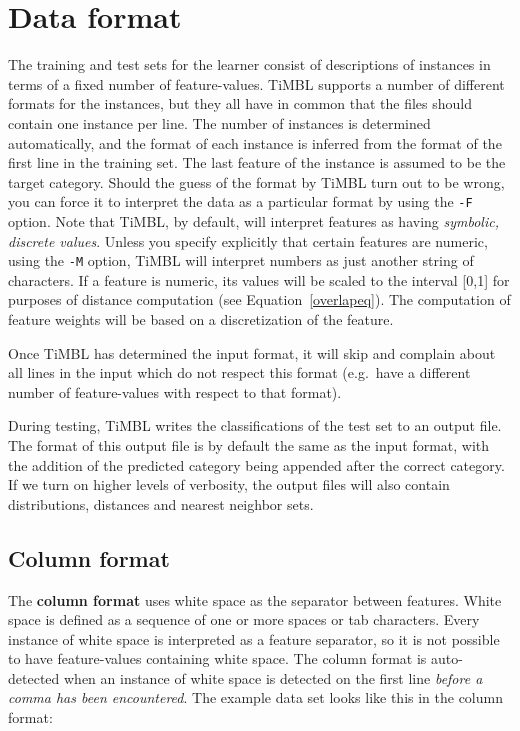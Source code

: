 \documentclass{report}
\begin{document}
\section{Data format}
\label{dataformats}

The training and test sets for the learner consist of descriptions of
instances in terms of a fixed number of feature-values. TiMBL supports
a number of different formats for the instances, but they all have in
common that the files should contain one instance per line. The number
of instances is determined automatically, and the format of each
instance is inferred from the format of the first line in the training
set. The last feature of the instance is assumed to be the target
category. Should the guess of the format by TiMBL turn out to be
wrong, you can force it to interpret the data as a particular format
by using the {\tt -F} option. Note that TiMBL, by default, will
interpret features as having {\em symbolic, discrete values}. Unless
you specify explicitly that certain features are numeric, using the
{\tt -M} option, TiMBL will interpret numbers as just another string
of characters. If a feature is numeric, its values will be scaled to
the interval [0,1] for purposes of distance computation (see
Equation~\ref{overlapeq}). The computation of feature weights will be
based on a discretization of the feature.

Once TiMBL has determined the input format, it will skip and complain
about all lines in the input which do not respect this format
(e.g.~have a different number of feature-values with respect to that
format).

During testing, TiMBL writes the classifications of the test set to an
output file. The format of this output file is by default the same as
the input format, with the addition of the predicted category being
appended after the correct category. If we turn on higher levels of
verbosity, the output files will also contain distributions, distances
and nearest neighbor sets.

\subsection{Column format}
\label{comlumnformat}

The {\bf column format} uses white space as the separator between
features. White space is defined as a sequence of one or more spaces or
tab characters. Every instance of white space is interpreted as a
feature separator, so it is not possible to have feature-values
containing white space. The column format is auto-detected when an
instance of white space is detected on the first line {\em before a
comma has been encountered}. The example data set looks like this in
the column format:
\end{document}
